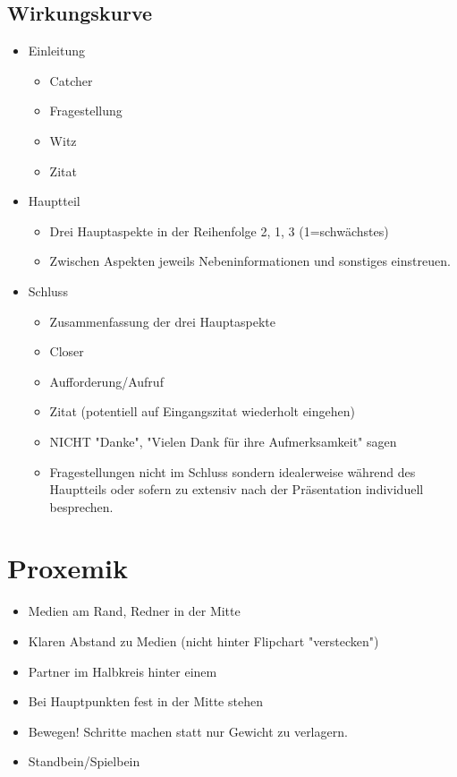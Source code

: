 \documentclass[../main.tex]{subfiles}
\begin{document}
        \subsection{Wirkungskurve}
        	\label{section:Seminar:RhetorikI:Wirkungskurve}
        	\begin{itemize}
        		\item Einleitung
        		\begin{itemize}
        			\item Catcher
        			\item Fragestellung
        			\item Witz
        			\item Zitat
        		\end{itemize}
        		\item Hauptteil
        		\begin{itemize}
        			\item Drei Hauptaspekte in der Reihenfolge 2, 1, 3 (1=schwächstes)
        			\item Zwischen Aspekten jeweils Nebeninformationen und sonstiges einstreuen.
        		\end{itemize}
        		\item Schluss
        		\begin{itemize}
        			\item Zusammenfassung der drei Hauptaspekte
        			\item Closer
        			\item Aufforderung/Aufruf
        			\item Zitat (potentiell auf Eingangszitat wiederholt eingehen)
        			\item NICHT "Danke", "Vielen Dank für ihre Aufmerksamkeit" sagen
        			\item Fragestellungen nicht im Schluss sondern idealerweise während des Hauptteils oder sofern zu extensiv nach der Präsentation individuell besprechen. 
        		\end{itemize}
        	\end{itemize}
            
    \section{Proxemik}
    	\begin{itemize}
    		\item Medien am Rand, Redner in der Mitte
    		\item Klaren Abstand zu Medien (nicht hinter Flipchart "verstecken")
    		\item Partner im Halbkreis hinter einem
    		\item Bei Hauptpunkten fest in der Mitte stehen 
    		\item Bewegen! Schritte machen statt nur Gewicht zu verlagern.
    		\item Standbein/Spielbein
    	\end{itemize}
    
\end{document}
